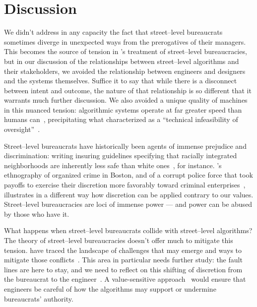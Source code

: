 \documentclass[main]{subfiles}
\begin{document}
\section{Discussion}

We didn't address in any capacity the fact that
street--level bureaucrats sometimes diverge in unexpected ways from the prerogatives of their managers.
This becomes the source of tension in
\citeauthor{lipsky1983street}'s treatment of street--level bureaucracies,
but in our discussion of the relationships between street--level algorithms and their stakeholders,
we avoided the relationship between engineers and designers and the systems themselves.
Suffice it to say that while there is a disconnect between intent and outcome,
the nature of that relationship is so different that it warrants much further discussion.
We also avoided a unique quality of machines in this nuanced tension:
algorithmic systems operate at far greater speed than humans can~\cite{Matthias2004},
precipitating what \citeauthor{doi:10.1177/2053951716679679} characterized as a
``technical infeasibility of oversight''~\cite{doi:10.1177/2053951716679679}.


Street--level bureaucrats have historically been agents of immense prejudice and discrimination:
writing insuring guidelines specifying that racially integrated neighborhoods are
inherently less safe than white ones~\cite{rothstein2017color}, for instance.
\citeauthor{whyte2012street}'s ethnography of organized crime in Boston,
and of a corrupt police force
that took payoffs to exercise their discretion more favorably toward criminal enterprises~\cite{whyte2012street},
illustrates in a different way how discretion can be applied contrary to our values.
Street--level bureaucracies are loci of immense power
--- and power can be abused by those who have it.

What happens when street--level bureaucrats collide with street--level algorithms?
The theory of street--level bureaucracies doesn't offer much to mitigate this tension.
\citeauthor{Veale:2018:FAD:3173574.3174014,doi:10.1177/2053951717718855} have
traced the landscape of challenges that may emerge
and ways to mitigate those conflicts~\cite{Veale:2018:FAD:3173574.3174014,doi:10.1177/2053951717718855}.
This area in particular needs further study:
the fault lines are here to stay, and we need to reflect on
this shifting of discretion from the bureaucrat to the engineer~\cite{eubanks2018automating}.
A value-sensitive approach~\cite{zhuvalue} would ensure that engineers be careful of
how the algorithms may support or undermine bureaucrats' authority.
\end{document}
